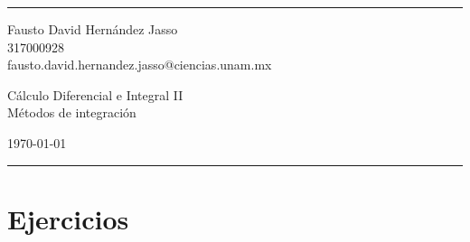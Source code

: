 \documentclass[a4paper]{article}
\begin{document}

\fancyhead[C]{}
\hrule \medskip %
\begin{minipage}{0.35\textwidth} 
\raggedright
\footnotesize
Fausto David Hernández Jasso \hfill\\   
317000928 \hfill\\
fausto.david.hernandez.jasso@ciencias.unam.mx
\end{minipage}
\begin{minipage}{0.4\textwidth} 
\centering 
\large 
Cálculo Diferencial e Integral II\\ 
\normalsize 
Métodos de integración\\ 
\end{minipage}
\begin{minipage}{0.24\textwidth} 
\raggedleft
\today\hfill\\
\end{minipage}
\medskip\hrule 
\bigskip
\section{Ejercicios}
\end{document}
